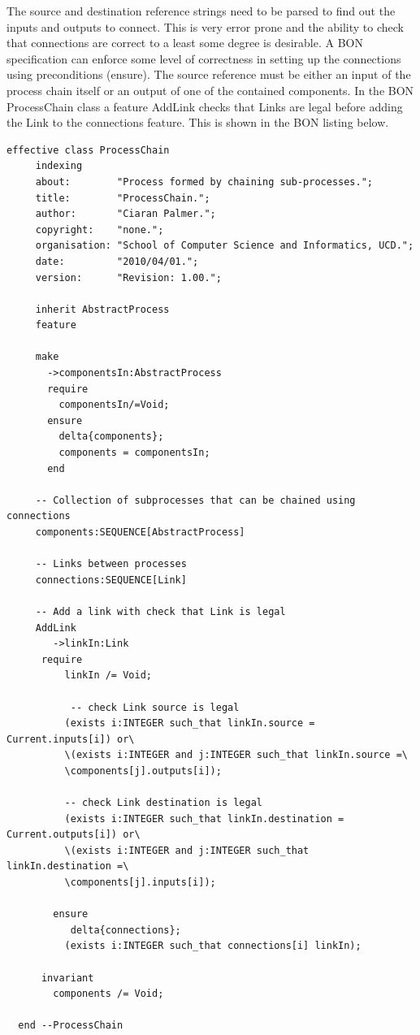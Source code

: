 \documentclass[]{final_report}
\begin{document}
The source and destination reference strings need to be parsed to find out the inputs and outputs to connect. This is very error prone and the ability to check that connections are correct to a least some degree is desirable. A BON specification can enforce some level of correctness in setting up the connections using preconditions (ensure). The source reference must be either an input of the process chain itself or an output of one of the contained components. In the BON ProcessChain class a feature AddLink checks that Links are legal before adding the Link to the connections feature. This is shown in the BON listing below.

\begin{lstlisting}[basicstyle=\scriptsize,showspaces=false,showstringspaces=false, caption=BON ProcessChaing]  
effective class ProcessChain
     indexing
     about:        "Process formed by chaining sub-processes.";
     title:        "ProcessChain.";
     author:       "Ciaran Palmer.";
     copyright:    "none.";
     organisation: "School of Computer Science and Informatics, UCD.";
     date:         "2010/04/01.";
     version:      "Revision: 1.00.";

     inherit AbstractProcess
     feature
     
     make
       ->componentsIn:AbstractProcess
       require
         componentsIn/=Void;         
       ensure
         delta{components};
         components = componentsIn;
       end
     
     -- Collection of subprocesses that can be chained using connections      
     components:SEQUENCE[AbstractProcess]
     
     -- Links between processes
     connections:SEQUENCE[Link]
     
     -- Add a link with check that Link is legal
     AddLink
        ->linkIn:Link
      require
          linkIn /= Void;

           -- check Link source is legal
          (exists i:INTEGER such_that linkIn.source = Current.inputs[i]) or\
          \(exists i:INTEGER and j:INTEGER such_that linkIn.source =\
          \components[j].outputs[i]);

          -- check Link destination is legal
          (exists i:INTEGER such_that linkIn.destination = Current.outputs[i]) or\
          \(exists i:INTEGER and j:INTEGER such_that linkIn.destination =\
          \components[j].inputs[i]);

        ensure
           delta{connections};
          (exists i:INTEGER such_that connections[i] linkIn);
      
      invariant
        components /= Void;
        
  end --ProcessChain
 \end{lstlisting}
\end{document}
